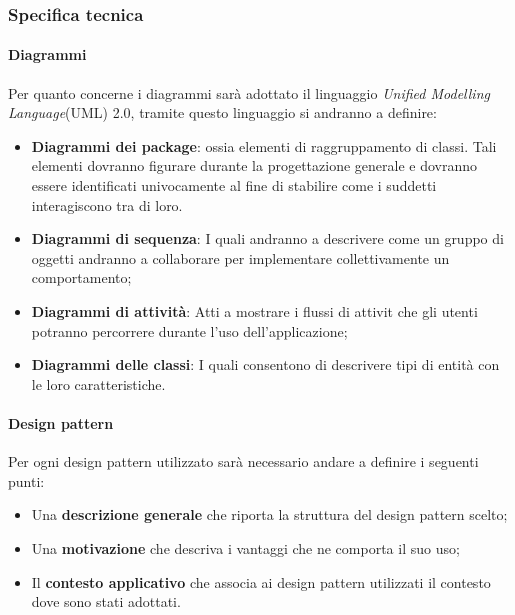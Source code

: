\subsubsection{Specifica tecnica}
\paragraph{Diagrammi}
Per quanto concerne i diagrammi sarà adottato il linguaggio \textit{Unified Modelling Language}(UML) 2.0,
tramite questo linguaggio si andranno a definire:
\begin{itemize}
\item \textbf{Diagrammi dei package}: ossia elementi di raggruppamento di classi. Tali elementi dovranno figurare durante la progettazione generale e dovranno essere identificati univocamente al fine di stabilire come i suddetti interagiscono tra di loro.

\item \textbf{Diagrammi di sequenza}: I quali andranno a descrivere come un gruppo di oggetti andranno a collaborare per implementare collettivamente un comportamento;

\item \textbf{Diagrammi di attività}: Atti a mostrare i flussi di attivit che gli utenti potranno percorrere durante l'uso dell'applicazione;

\item \textbf{Diagrammi delle classi}: I quali consentono di descrivere tipi di entità con le loro caratteristiche.
\end{itemize}

\paragraph{Design pattern}
Per ogni design pattern utilizzato sarà necessario andare a definire i seguenti punti:
\begin{itemize}
\item Una \textbf{descrizione generale} che riporta la struttura del design pattern scelto;
\item Una \textbf{motivazione} che descriva i vantaggi che ne comporta il suo uso;
\item Il \textbf{contesto applicativo} che associa ai design pattern utilizzati il contesto dove sono stati adottati.
\end{itemize}

